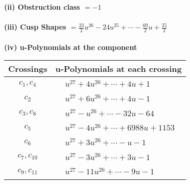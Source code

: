 \documentclass[1p]{elsarticle_modified}
\theoremstyle{definition}
\begin{document}
\flushleft \textbf{(ii) Obstruction class $= -1$}\\~\\
\flushleft \textbf{(iii) Cusp Shapes $= \frac{23}{2} u^{26}-24 u^{25}+\cdots-\frac{69}{2} u+\frac{25}{2}$}\\~\\
\newpage\renewcommand{\arraystretch}{1}
\flushleft \textbf{(iv) u-Polynomials at the component}\newline \\
\begin{tabular}{m{50pt}|m{274pt}}
Crossings & \hspace{64pt}u-Polynomials at each crossing \\
\hline $$\begin{aligned}c_{1},c_{4}\end{aligned}$$&$\begin{aligned}
&u^{27}+4 u^{26}+\cdots+4 u+1
\end{aligned}$\\
\hline $$\begin{aligned}c_{2}\end{aligned}$$&$\begin{aligned}
&u^{27}+6 u^{26}+\cdots+4 u-1
\end{aligned}$\\
\hline $$\begin{aligned}c_{3},c_{8}\end{aligned}$$&$\begin{aligned}
&u^{27}- u^{26}+\cdots-32 u-64
\end{aligned}$\\
\hline $$\begin{aligned}c_{5}\end{aligned}$$&$\begin{aligned}
&u^{27}-4 u^{26}+\cdots+6988 u+1153
\end{aligned}$\\
\hline $$\begin{aligned}c_{6}\end{aligned}$$&$\begin{aligned}
&u^{27}+3 u^{26}+\cdots- u-1
\end{aligned}$\\
\hline $$\begin{aligned}c_{7},c_{10}\end{aligned}$$&$\begin{aligned}
&u^{27}-3 u^{26}+\cdots+3 u-1
\end{aligned}$\\
\hline $$\begin{aligned}c_{9},c_{11}\end{aligned}$$&$\begin{aligned}
&u^{27}-11 u^{26}+\cdots-9 u-1
\end{aligned}$\\
\hline
\end{tabular}\\~\\
\end{document}
